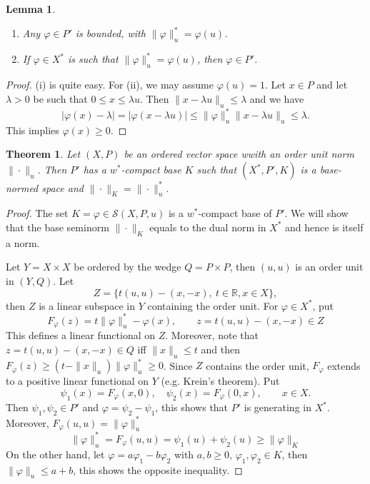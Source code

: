 \documentclass[12pt]{article}
\newtheorem{lemma}{Lemma}
\newtheorem{thm}{Theorem}
\theoremstyle{remark}
\newcommand{\<}{\langle}
\begin{document}
\begin{lemma} 
\begin{enumerate}
\item[(i)] Any $\varphi\in P'$ is bounded, with $\|\varphi\|_u^*=\varphi(u)$.
\item[(ii)] If $\varphi\in X^*$ is such that $\|\varphi\|_u^*=\varphi(u)$, then $\varphi\in P'$.
\end{enumerate}


\end{lemma}
\begin{proof}
 (i) is quite easy. For (ii), we may assume $\varphi(u)=1$. Let $x\in P$ and let $\lambda>0$ be such that $0\le x\le \lambda u$. Then
 $\|x-\lambda u\|_u\le \lambda$ and we have
 \[
|\varphi(x)-\lambda|=|\varphi(x-\lambda u)|\le \|\varphi\|_u^*\|x-\lambda u\|_u\le \lambda.
 \]
This implies $\varphi(x)\ge 0$.

\end{proof}



\begin{thm}\label{thm:ou_dual} Let $(X,P)$ be an ordered vector space wwith an order unit norm $\|\cdot\|_u$. Then 
$P'$  has a $w^*$-compact base $K$ such that  $(X^*,P',K)$ is a base-normed space and $\|\cdot\|_K=\|\cdot\|_u^*$. 

\end{thm}


\begin{proof}\cite{ellis} The set $K=\varphi\in \mathcal S(X,P,u)$  is a  $w^*$-compact  base of $P'$. We will show that the base seminorm $\|\cdot\|_K$ equals to the dual norm in $X^*$ and hence is itself a norm.

Let $Y=X\times X$ be ordered by the wedge $Q=P\times P$, then $(u,u)$ is an order unit in $(Y,Q)$.
Let 
\[
Z=\{t(u,u)-(x,-x),\ t\in \mathbb R, x\in X\},
\]
then $Z$ is a linear subspace in $Y$ containing the order unit. 
For  $\varphi\in X^*$,  put 
\[
F_\varphi(z)=t\|\varphi\|_u^*-\varphi(x), \qquad z=t(u,u)-(x,-x)\in Z
\]
This defines a linear functional on $Z$. Moreover, note that $z=t(u,u)-(x,-x)\in Q$ iff $\|x\|_u\le t$ and then $F_\varphi(z)\ge (t-\|x\|_u)\|\varphi\|_u^*\ge 0$.
Since $Z$ contains the order unit, $F_\varphi$ extends to a positive linear functional on $Y$ (e.g. Krein's theorem). Put 
\[
\psi_1(x)=F_\varphi(x,0),\quad \psi_2(x)=F_\varphi(0,x),\qquad x\in X.
\]
Then $\psi_1,\psi_2\in P'$ and $\varphi=\psi_2-\psi_1$, this shows that $P'$ is generating in $X^*$. Moreover, $F_\varphi(u,u)=\|\varphi\|_u^*$
\[
\|\varphi\|_u^*=F_\varphi(u,u)= \psi_1(u)+\psi_2(u)\ge \|\varphi\|_K
\]
On the other hand, let $\varphi=a\varphi_1- b\varphi_2$ with $a,b\ge 0$, $\varphi_1,\varphi_2\in K$, then
$\|\varphi\|_u\le a+b$, this shows the opposite inequality.

\end{proof}
\end{document}
